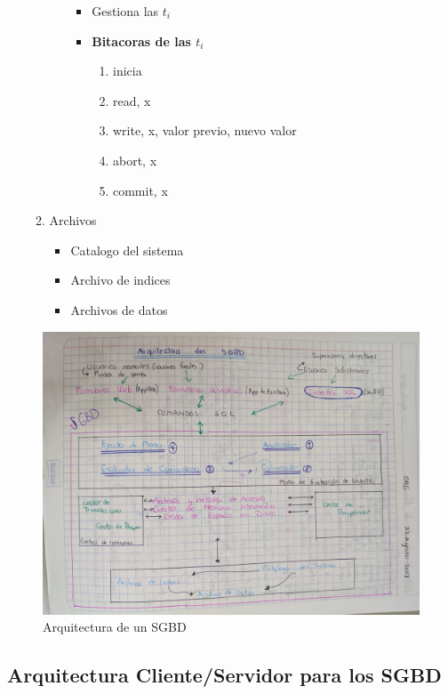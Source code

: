 \documentclass[twoside]{article}
\begin{document}
\begin{enumerate}
\begin{enumerate}
\begin{itemize}
    \begin{itemize}
      \item Gestiona las $t_i$
      \item \textbf{Bitacoras de las $t_i$}
      \begin{enumerate}
        \item inicia
        \item read, x
        \item write, x, valor previo, nuevo valor
        \item abort, x
        \item commit, x
      \end{enumerate}
    \end{itemize}
    \end{itemize}
    \item Archivos
    \begin{itemize}
      \item Catalogo del sistema
      \item Archivo de indices
      \item Archivos de datos
    \end{itemize}
  \end{enumerate}
\end{enumerate}

\begin{figure}[htb]
  \includegraphics[width=\linewidth]{arqsgbd.jpg}
  \caption{Arquitectura de un SGBD}
\end{figure}

\clearpage


\subsection{Arquitectura Cliente/Servidor para los SGBD}
\end{document}
